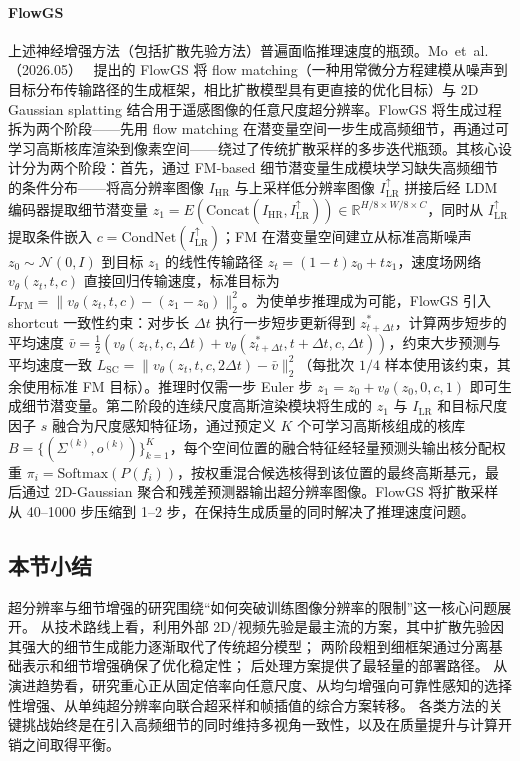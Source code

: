 \paragraph{FlowGS}
上述神经增强方法（包括扩散先验方法）普遍面临推理速度的瓶颈。Mo~et~al.（2026.05）~\cite{2605_22147} 提出的 FlowGS 将 flow matching（一种用常微分方程建模从噪声到目标分布传输路径的生成框架，相比扩散模型具有更直接的优化目标）与 2D Gaussian splatting 结合用于遥感图像的任意尺度超分辨率。FlowGS 将生成过程拆为两个阶段——先用 flow matching 在潜变量空间一步生成高频细节，再通过可学习高斯核库渲染到像素空间——绕过了传统扩散采样的多步迭代瓶颈。其核心设计分为两个阶段：首先，通过 FM-based 细节潜变量生成模块学习缺失高频细节的条件分布——将高分辨率图像 $I_\text{HR}$ 与上采样低分辨率图像 $I_\text{LR}^\uparrow$ 拼接后经 LDM 编码器提取细节潜变量 $z_1 = E(\text{Concat}(I_\text{HR}, I_\text{LR}^\uparrow)) \in \mathbb{R}^{H/8 \times W/8 \times C}$，同时从 $I_\text{LR}^\uparrow$ 提取条件嵌入 $c = \text{CondNet}(I_\text{LR}^\uparrow)$；FM 在潜变量空间建立从标准高斯噪声 $z_0 \sim \mathcal{N}(0, I)$ 到目标 $z_1$ 的线性传输路径 $z_t = (1{-}t)z_0 + tz_1$，速度场网络 $v_\theta(z_t, t, c)$ 直接回归传输速度，标准目标为 $L_\text{FM} = \|v_\theta(z_t, t, c) - (z_1 - z_0)\|_2^2$。为使单步推理成为可能，FlowGS 引入 shortcut 一致性约束：对步长 $\Delta t$ 执行一步短步更新得到 $z_{t+\Delta t}^*$，计算两步短步的平均速度 $\bar{v} = \frac{1}{2}(v_\theta(z_t, t, c, \Delta t) + v_\theta(z_{t+\Delta t}^*, t{+}\Delta t, c, \Delta t))$，约束大步预测与平均速度一致 $L_\text{SC} = \|v_\theta(z_t, t, c, 2\Delta t) - \bar{v}\|_2^2$（每批次 $1/4$ 样本使用该约束，其余使用标准 FM 目标）。推理时仅需一步 Euler 步 $z_1 = z_0 + v_\theta(z_0, 0, c, 1)$ 即可生成细节潜变量。第二阶段的连续尺度高斯渲染模块将生成的 $z_1$ 与 $I_\text{LR}$ 和目标尺度因子 $s$ 融合为尺度感知特征场，通过预定义 $K$ 个可学习高斯核组成的核库 $B = \{(\Sigma^{(k)}, o^{(k)})\}_{k=1}^K$，每个空间位置的融合特征经轻量预测头输出核分配权重 $\pi_i = \text{Softmax}(P(f_i))$，按权重混合候选核得到该位置的最终高斯基元，最后通过 2D-Gaussian 聚合和残差预测器输出超分辨率图像。FlowGS 将扩散采样从 40--1000 步压缩到 1--2 步，在保持生成质量的同时解决了推理速度问题。

\subsection{本节小结}

超分辨率与细节增强的研究围绕“如何突破训练图像分辨率的限制”这一核心问题展开。
从技术路线上看，利用外部 2D/视频先验是最主流的方案，其中扩散先验因其强大的细节生成能力逐渐取代了传统超分模型；
两阶段粗到细框架通过分离基础表示和细节增强确保了优化稳定性；
后处理方案提供了最轻量的部署路径。
从演进趋势看，研究重心正从固定倍率向任意尺度、从均匀增强向可靠性感知的选择性增强、从单纯超分辨率向联合超采样和帧插值的综合方案转移。
各类方法的关键挑战始终是在引入高频细节的同时维持多视角一致性，以及在质量提升与计算开销之间取得平衡。

